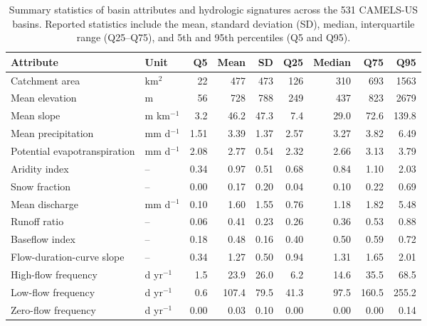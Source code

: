 
\begin{table}[!htbp]
\centering
\caption{Summary statistics of basin attributes and hydrologic signatures across the 531 CAMELS-US basins. Reported statistics include the mean, standard deviation (SD), median, interquartile range (Q25--Q75), and 5th and 95th percentiles (Q5 and Q95).}
\label{tab:supp_overall_summary}

\scriptsize
\setlength{\tabcolsep}{2.5pt}
\renewcommand{\arraystretch}{1.12}

\begin{tabular*}{\linewidth}{@{\extracolsep{\fill}}llrrrrrrr@{}}
\toprule
Attribute & Unit & Q5 & Mean & SD & Q25 & Median & Q75 & Q95 \\
\midrule
Catchment area & km$^2$ & 22 & 477 & 473 & 126 & 310 & 693 & 1563 \\
Mean elevation & m & 56 & 728 & 788 & 249 & 437 & 823 & 2679 \\
Mean slope & m km$^{-1}$ & 3.2 & 46.2 & 47.3 & 7.4 & 29.0 & 72.6 & 139.8 \\
Mean precipitation & mm d$^{-1}$ & 1.51 & 3.39 & 1.37 & 2.57 & 3.27 & 3.82 & 6.49 \\
Potential evapotranspiration & mm d$^{-1}$ & 2.08 & 2.77 & 0.54 & 2.32 & 2.66 & 3.13 & 3.79 \\
Aridity index & -- & 0.34 & 0.97 & 0.51 & 0.68 & 0.84 & 1.10 & 2.03 \\
Snow fraction & -- & 0.00 & 0.17 & 0.20 & 0.04 & 0.10 & 0.22 & 0.69 \\
Mean discharge & mm d$^{-1}$ & 0.10 & 1.60 & 1.55 & 0.76 & 1.18 & 1.82 & 5.48 \\
Runoff ratio & -- & 0.06 & 0.41 & 0.23 & 0.26 & 0.36 & 0.53 & 0.88 \\
Baseflow index & -- & 0.18 & 0.48 & 0.16 & 0.40 & 0.50 & 0.59 & 0.72 \\
Flow-duration-curve slope & -- & 0.34 & 1.27 & 0.50 & 0.94 & 1.31 & 1.65 & 2.01 \\
High-flow frequency & d yr$^{-1}$ & 1.5 & 23.9 & 26.0 & 6.2 & 14.6 & 35.5 & 68.5 \\
Low-flow frequency & d yr$^{-1}$ & 0.6 & 107.4 & 79.5 & 41.3 & 97.5 & 160.5 & 255.2 \\
Zero-flow frequency & d yr$^{-1}$ & 0.00 & 0.03 & 0.10 & 0.00 & 0.00 & 0.00 & 0.14 \\
\bottomrule
\end{tabular*}

\end{table}

